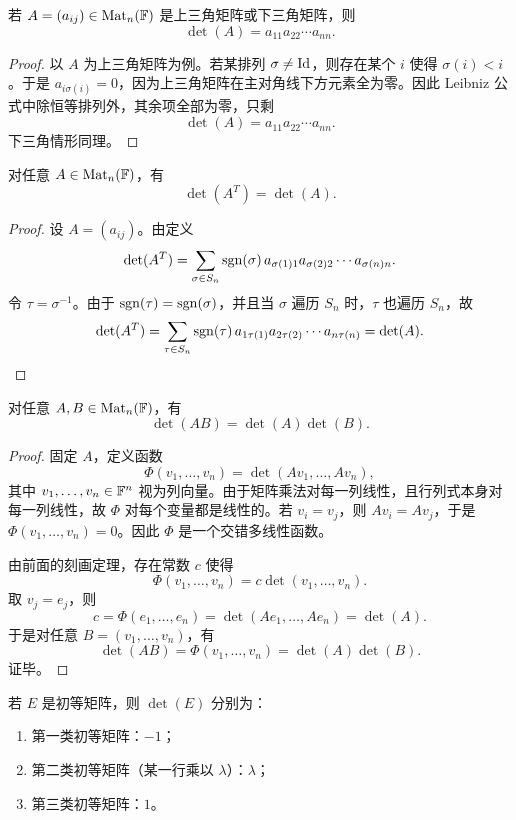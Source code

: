 \begin{proposition}[三角矩阵的行列式]
若 $A=(a_{ij})\in\mathrm{Mat}_n(\mathbb{F})$ 是上三角矩阵或下三角矩阵，则
\[
\det(A)=a_{11}a_{22}\cdots a_{nn}.
\]
\end{proposition}

\begin{proof}
以 $A$ 为上三角矩阵为例。若某排列 $\sigma\ne \mathrm{Id}$，则存在某个 $i$ 使得 $\sigma(i)<i$。于是 $a_{i\sigma(i)}=0$，因为上三角矩阵在主对角线下方元素全为零。因此 Leibniz 公式中除恒等排列外，其余项全部为零，只剩
\[
\det(A)=a_{11}a_{22}\cdots a_{nn}.
\]
下三角情形同理。
\end{proof}

\begin{theorem}[转置不改变行列式]
对任意 $A\in\mathrm{Mat}_n(\mathbb{F})$，有
\[
\det(A^T)=\det(A).
\]
\end{theorem}

\begin{proof}
设 $A=(a_{ij})$。由定义
\[
\det(A^T)=\sum_{\sigma\in S_n}\operatorname{sgn}(\sigma)\,a_{\sigma(1)1}a_{\sigma(2)2}\cdots a_{\sigma(n)n}.
\]
令 $\tau=\sigma^{-1}$。由于 $\operatorname{sgn}(\tau)=\operatorname{sgn}(\sigma)$，并且当 $\sigma$ 遍历 $S_n$ 时，$\tau$ 也遍历 $S_n$，故
\[
\det(A^T)=\sum_{\tau\in S_n}\operatorname{sgn}(\tau)\,a_{1\tau(1)}a_{2\tau(2)}\cdots a_{n\tau(n)}=\det(A).
\]
\end{proof}

\begin{theorem}[乘积的行列式]
对任意 $A,B\in\mathrm{Mat}_n(\mathbb{F})$，有
\[
\det(AB)=\det(A)\det(B).
\]
\end{theorem}

\begin{proof}
固定 $A$，定义函数
\[
\Phi(v_1,\dots,v_n)=\det(Av_1,\dots,Av_n),
\]
其中 $v_1,\dots,v_n\in\mathbb{F}^n$ 视为列向量。由于矩阵乘法对每一列线性，且行列式本身对每一列线性，故 $\Phi$ 对每个变量都是线性的。若 $v_i=v_j$，则 $Av_i=Av_j$，于是 $\Phi(v_1,\dots,v_n)=0$。因此 $\Phi$ 是一个交错多线性函数。

由前面的刻画定理，存在常数 $c$ 使得
\[
\Phi(v_1,\dots,v_n)=c\det(v_1,\dots,v_n).
\]
取 $v_j=e_j$，则
\[
c=\Phi(e_1,\dots,e_n)=\det(Ae_1,\dots,Ae_n)=\det(A).
\]
于是对任意 $B=(v_1,\dots,v_n)$，有
\[
\det(AB)=\Phi(v_1,\dots,v_n)=\det(A)\det(B).
\]
证毕。
\end{proof}

\begin{corollary}
若 $E$ 是初等矩阵，则 $\det(E)$ 分别为：
\begin{enumerate}[label=(\arabic*)]
  \item 第一类初等矩阵：$-1$；
  \item 第二类初等矩阵（某一行乘以 $\lambda$）：$\lambda$；
  \item 第三类初等矩阵：$1$。
\end{enumerate}
\end{corollary}

